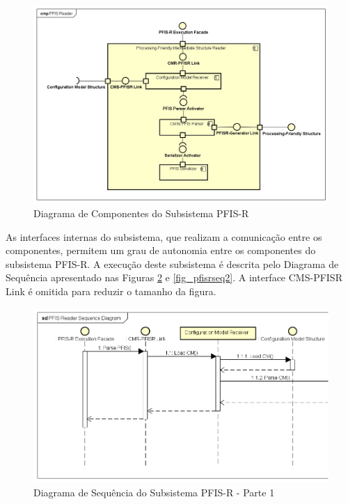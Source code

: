 \begin{figure}[htb]
    \begin{center}
        \includegraphics[scale=0.52]{imagens/PFIS_Reader_Subcomponent_Diagram.png}
    \end{center}
	\caption{\label{fig_pfisrcom}Diagrama de Componentes do Subsistema PFIS-R}
\end{figure}

As interfaces internas do subsistema, que realizam a comunicação entre os componentes, permitem um grau de autonomia entre os componentes do subsistema PFIS-R. A execução deste subsistema é descrita pelo Diagrama de Sequência apresentado nas Figuras \ref{fig_pfisrseq1} e \ref{fig_pfisrseq2}. A interface CMS-PFISR Link é omitida para reduzir o tamanho da figura.

\begin{figure}[htb]
    \begin{center}
        \includegraphics[scale=0.57]{imagens/PFIS_Reader_Sequence_Diagram_1.png}
    \end{center}
	\caption{\label{fig_pfisrseq1}Diagrama de Sequência do Subsistema PFIS-R - Parte 1}
\end{figure}

